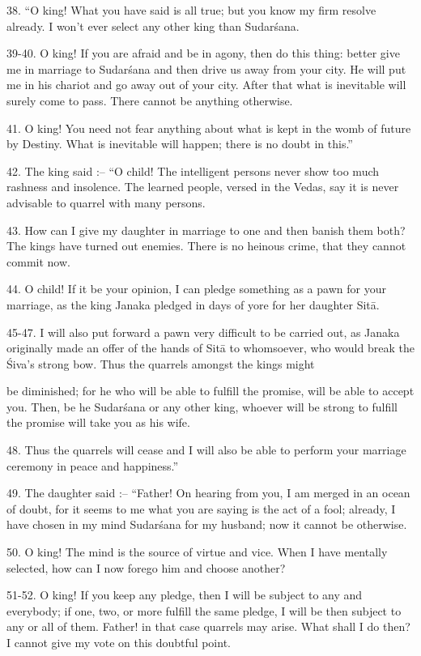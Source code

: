 38. ``O king! What you have said is all true; but you know my firm resolve already. I won't ever select any other king than Sudar\'sana.

39-40. O king! If you are afraid and be in agony, then do this thing: better give me in marriage to Sudar\'sana and then drive us away from your city. He will put me in his chariot and go away out of your city. After that what is inevitable will surely come to pass. There cannot be anything otherwise.

41. O king! You need not fear anything about what is kept in the womb of future by Destiny. What is inevitable will happen; there is no doubt in this.''

42. The king said :-- ``O child! The intelligent persons never show too much rashness and insolence. The learned people, versed in the Vedas, say it is never advisable to quarrel with many persons.

43. How can I give my daughter in marriage to one and then banish them both? The kings have turned out enemies. There is no heinous crime, that they cannot commit now.

44. O child! If it be your opinion, I can pledge something as a pawn for your marriage, as the king Janaka pledged in days of yore for her daughter Sit\=a.

45-47. I will also put forward a pawn very difficult to be carried out, as Janaka originally made an offer of the hands of Sit\=a to whomsoever, who would break the \'Siva's strong bow. Thus the quarrels amongst the kings might

be diminished; for he who will be able to fulfill the promise, will be able to accept you. Then, be he Sudar\'sana or any other king, whoever will be strong to fulfill the promise will take you as his wife.

48. Thus the quarrels will cease and I will also be able to perform your marriage ceremony in peace and happiness.''

49. The daughter said :-- ``Father! On hearing from you, I am merged in an ocean of doubt, for it seems to me what you are saying is the act of a fool; already, I have chosen in my mind Sudar\'sana for my husband; now it cannot be otherwise.

50. O king! The mind is the source of virtue and vice. When I have mentally selected, how can I now forego him and choose another?

51-52. O king! If you keep any pledge, then I will be subject to any and everybody; if one, two, or more fulfill the same pledge, I will be then subject to any or all of them. Father! in that case quarrels may arise. What shall I do then? I cannot give my vote on this doubtful point.

